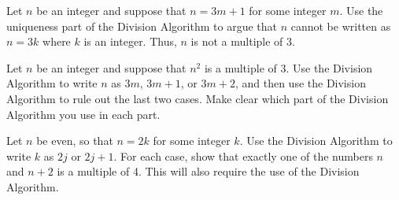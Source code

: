 \item Let $n$ be an integer and suppose that $n = 3m+1$ for some integer $m$.
Use the uniqueness part of the Division Algorithm to argue that $n$ cannot be written as $n = 3k$ where $k$ is an integer.
Thus, $n$ is not a multiple of 3.

\item Let $n$ be an integer and suppose that $n^2$ is a multiple of 3.
Use the Division Algorithm to write $n$ as $3m$, $3m+1$, or $3m+2$, and then use the Division Algorithm to rule out the last two cases.
Make clear which part of the Division Algorithm you use in each part.

\item Let $n$ be even, so that $n = 2k$ for some integer $k$.
Use the Division Algorithm to write $k$ as $2j$ or $2j+1$.
For each case, show that exactly one of the numbers $n$ and $n+2$ is a multiple of 4.
This will also require the use of the Division Algorithm.

\elist
\vfill          %
